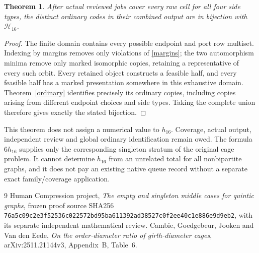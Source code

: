 \documentclass[11pt]{article}
\newtheorem{theorem}{Theorem}
\begin{document}
\begin{theorem}\label{coverage}
After actual reviewed jobs cover every raw cell for all four side types,
the distinct ordinary codes in their combined output are in bijection
with $\mathcal H_{16}$.
\end{theorem}
\begin{proof}
The finite domain contains every possible endpoint and port row
multiset. Indexing by margins removes only violations of
\eqref{margins}; the two automorphism minima remove only marked
isomorphic copies, retaining a representative of every such orbit.
Every retained object constructs a feasible half, and every feasible
half has a marked presentation somewhere in this exhaustive domain.
Theorem~\ref{ordinary} identifies precisely its ordinary copies,
including copies arising from different endpoint choices and side types.
Taking the complete union therefore gives exactly the stated bijection.
\end{proof}

This theorem does not assign a numerical value to $h_{16}$. Coverage,
actual output, independent review and global ordinary identification
remain owed. The formula $6h_{16}$ supplies only the corresponding
singleton stratum of the original cage problem. It cannot determine
$h_{16}$ from an unrelated total for all nonbipartite graphs, and it
does not pay an existing native queue record without a separate exact
family/coverage application.

\begin{thebibliography}{9}
 Human Compression project,
\emph{The empty and singleton middle cases for quintic graphs}, frozen
proof source SHA256
\texttt{76a5c09c2e3f52536c022572bd95ba611392ad38527c0f2ee40c1e886e9d9eb2},
with its separate independent mathematical review.
 Cambie, Goedgebeur, Jooken and Van den Eede,
\emph{On the order-diameter ratio of girth-diameter cages},
arXiv:2511.21144v3, Appendix~B, Table~6.
\end{thebibliography}
\end{document}
